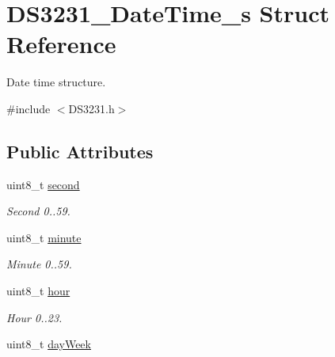 \hypertarget{struct_d_s3231___date_time__s}{}\section{D\+S3231\+\_\+\+Date\+Time\+\_\+s Struct Reference}
\label{struct_d_s3231___date_time__s}


Date time structure.  




{\ttfamily \#include $<$D\+S3231.\+h$>$}

\subsection*{Public Attributes}
\begin{DoxyCompactItemize}
\item 
uint8\+\_\+t \hyperlink{struct_d_s3231___date_time__s_ad023b19951e1bf1d2c8ff5a1a26a30d1}{second}\hypertarget{struct_d_s3231___date_time__s_ad023b19951e1bf1d2c8ff5a1a26a30d1}{}\label{struct_d_s3231___date_time__s_ad023b19951e1bf1d2c8ff5a1a26a30d1}

\begin{DoxyCompactList}\small\item\em Second 0..59. \end{DoxyCompactList}\item 
uint8\+\_\+t \hyperlink{struct_d_s3231___date_time__s_a1cea87cbb6606e5259ce7aadf068eb85}{minute}\hypertarget{struct_d_s3231___date_time__s_a1cea87cbb6606e5259ce7aadf068eb85}{}\label{struct_d_s3231___date_time__s_a1cea87cbb6606e5259ce7aadf068eb85}

\begin{DoxyCompactList}\small\item\em Minute 0..59. \end{DoxyCompactList}\item 
uint8\+\_\+t \hyperlink{struct_d_s3231___date_time__s_a7993110a1e27a217b2756d35ede55fc7}{hour}\hypertarget{struct_d_s3231___date_time__s_a7993110a1e27a217b2756d35ede55fc7}{}\label{struct_d_s3231___date_time__s_a7993110a1e27a217b2756d35ede55fc7}

\begin{DoxyCompactList}\small\item\em Hour 0..23. \end{DoxyCompactList}\item 
uint8\+\_\+t \hyperlink{struct_d_s3231___date_time__s_a29786860ba13a2fc3ac823752c18ef70}{day\+Week}\hypertarget{struct_d_s3231___date_time__s_a29786860ba13a2fc3ac823752c18ef70}{}\label{struct_d_s3231___date_time__s_a29786860ba13a2fc3ac823752c18ef70}


\end{DoxyCompactItemize}
